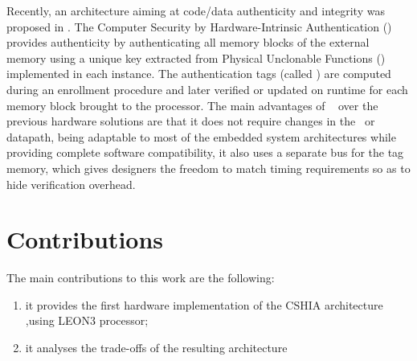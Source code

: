 Recently, an architecture aiming at code/data authenticity and integrity was proposed in \cite{Hoffman2015}. The Computer Security by Hardware-Intrinsic Authentication (\cshia) provides authenticity by authenticating all memory blocks of the external memory using a unique key extracted from Physical Unclonable Functions (\pufs) implemented in each instance. The authentication tags (called \ptags) are computed during an enrollment procedure and later verified or updated on runtime for each memory block brought to the processor. The main advantages of \cshia~ over the previous hardware solutions are that it does not require changes in the \isa~or datapath, being adaptable to most of the embedded system architectures while providing complete software compatibility, it also uses a separate bus for the tag memory, which gives designers the freedom to match timing requirements so as to hide verification overhead.






\section{Contributions}
\label{sec:contributions}
The main contributions to this work are the following: 
\begin{enumerate}[label=(\alph*)]
    \item it provides the first hardware implementation of the CSHIA architecture ,using LEON3 processor;
    \item it analyses the trade-offs of the resulting architecture 
\end{enumerate}

